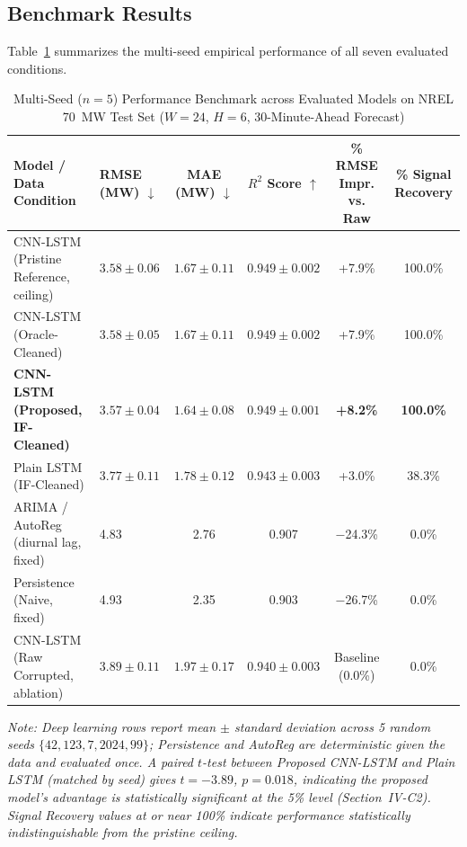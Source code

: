 \documentclass[conference]{IEEEtran}
\begin{document}
\subsection{Benchmark Results}
Table~\ref{tab:results} summarizes the multi-seed empirical performance of all seven evaluated conditions.

\begin{table}[t]
\centering
\caption{Multi-Seed ($n=5$) Performance Benchmark across Evaluated Models on NREL 70~MW Test Set ($W{=}24$, $H{=}6$, 30-Minute-Ahead Forecast)}
\label{tab:results}
\begin{tabular}{@{}llcccc@{}}
\toprule
\textbf{Model / Data Condition} & \textbf{RMSE (MW) $\downarrow$} & \textbf{MAE (MW) $\downarrow$} & \textbf{$R^2$ Score $\uparrow$} & \textbf{\% RMSE Impr. vs. Raw} & \textbf{\% Signal Recovery} \\
\midrule
CNN-LSTM (Pristine Reference, ceiling) & $3.58 \pm 0.06$ & $1.67 \pm 0.11$ & $0.949 \pm 0.002$ & +7.9\% & 100.0\% \\
CNN-LSTM (Oracle-Cleaned)              & $3.58 \pm 0.05$ & $1.67 \pm 0.11$ & $0.949 \pm 0.002$ & +7.9\% & 100.0\% \\
\textbf{CNN-LSTM (Proposed, IF-Cleaned)} & $\mathbf{3.57 \pm 0.04}$ & $\mathbf{1.64 \pm 0.08}$ & $\mathbf{0.949 \pm 0.001}$ & \textbf{+8.2\%} & \textbf{100.0\%} \\
Plain LSTM (IF-Cleaned)                & $3.77 \pm 0.11$ & $1.78 \pm 0.12$ & $0.943 \pm 0.003$ & +3.0\% & 38.3\% \\
ARIMA / AutoReg (diurnal lag, fixed)   & 4.83 & 2.76 & 0.907 & $-$24.3\% & 0.0\% \\
Persistence (Naive, fixed)             & 4.93 & 2.35 & 0.903 & $-$26.7\% & 0.0\% \\
CNN-LSTM (Raw Corrupted, ablation)     & $3.89 \pm 0.11$ & $1.97 \pm 0.17$ & $0.940 \pm 0.003$ & Baseline (0.0\%) & 0.0\% \\
\bottomrule
\end{tabular}

\vspace{4pt}
\footnotesize{\textit{Note: Deep learning rows report mean $\pm$ standard deviation across 5 random seeds $\{42, 123, 7, 2024, 99\}$; Persistence and AutoReg are deterministic given the data and evaluated once. A paired $t$-test between Proposed CNN-LSTM and Plain LSTM (matched by seed) gives $t=-3.89$, $p=0.018$, indicating the proposed model's advantage is statistically significant at the 5\% level (Section~IV-C2). Signal Recovery values at or near 100\% indicate performance statistically indistinguishable from the pristine ceiling.}}
\end{table}
\end{document}
